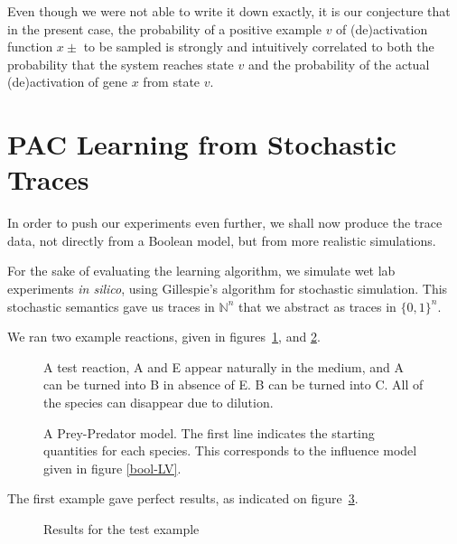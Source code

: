 \documentclass{llncs}
\begin{document}
Even though we were not able to write it down exactly, it is our conjecture that in the present case, the probability of a positive example $v$ of (de)activation function $x\pm$ to be sampled is strongly and intuitively correlated to both the probability that the system reaches state $v$ and the probability of the actual (de)activation of gene $x$ from state $v$. 



\section{PAC Learning from Stochastic Traces}

In order to push our experiments even further, we shall now produce the trace
data, not directly from a Boolean model, but from more realistic simulations.

For the sake of evaluating the learning algorithm,
we simulate wet lab experiments \emph{in silico}, using Gillespie's algorithm for stochastic simulation.
This stochastic semantics gave us traces in ${\mathbb{N}}^n$ that we abstract as traces in ${\{0,1\}}^n$.



We ran two example reactions, given in figures~\ref{test}, and \ref{preypred}.

\begin{figure}[htbp]
	
	\vspace{-1em}
	\caption{A test reaction, A and E appear naturally in the medium, and A can be turned into B in absence of E. B  can be turned into C. All of the species can disappear due to dilution.\label{test}}
\end{figure}
\begin{figure}[htbp]
	
	\vspace{-1em}
	\caption{A Prey-Predator model. The first line indicates the starting quantities for each species. This corresponds to the influence model given in figure \ref{bool-LV}.\label{preypred}}
\end{figure}

The first example gave perfect results, as indicated on figure~\ref{test_res}.
\begin{figure}
	
	\caption{Results for the test example\label{test_res}}
\end{figure}
\end{document}
